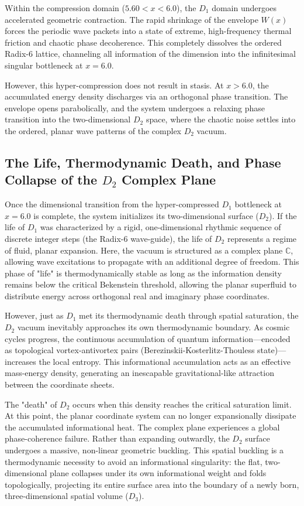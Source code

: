 \documentclass[11pt,a4paper]{article}
\theoremstyle{plain}
\theoremstyle{definition}
\theoremstyle{remark}
\begin{document}
Within the compression domain ($5.60 < x < 6.0$), the $D_1$ domain undergoes accelerated geometric contraction. The rapid shrinkage of the envelope $W(x)$ forces the periodic wave packets into a state of extreme, high-frequency thermal friction and chaotic phase decoherence. This completely dissolves the ordered Radix-6 lattice, channeling all information of the dimension into the infinitesimal singular bottleneck at $x = 6.0$.

However, this hyper-compression does not result in stasis. At $x > 6.0$, the accumulated energy density discharges via an orthogonal phase transition. The envelope opens parabolically, and the system undergoes a relaxing phase transition into the two-dimensional $D_2$ space, where the chaotic noise settles into the ordered, planar wave patterns of the complex $D_2$ vacuum.

\newpage
\subsection{The Life, Thermodynamic Death, and Phase Collapse of the $D_2$ Complex Plane}
Once the dimensional transition from the hyper-compressed $D_1$ bottleneck at $x = 6.0$ is complete, the system initializes its two-dimensional surface ($D_2$). If the life of $D_1$ was characterized by a rigid, one-dimensional rhythmic sequence of discrete integer steps (the Radix-6 wave-guide), the life of $D_2$ represents a regime of fluid, planar expansion. Here, the vacuum is structured as a complex plane $\mathbb{C}$, allowing wave excitations to propagate with an additional degree of freedom. This phase of "life" is thermodynamically stable as long as the information density remains below the critical Bekenstein threshold, allowing the planar superfluid to distribute energy across orthogonal real and imaginary phase coordinates.

However, just as $D_1$ met its thermodynamic death through spatial saturation, the $D_2$ vacuum inevitably approaches its own thermodynamic boundary. As cosmic cycles progress, the continuous accumulation of quantum information—encoded as topological vortex-antivortex pairs (Berezinskii-Kosterlitz-Thouless state)—increases the local entropy. This informational accumulation acts as an effective mass-energy density, generating an inescapable gravitational-like attraction between the coordinate sheets. 

The "death" of $D_2$ occurs when this density reaches the critical saturation limit. At this point, the planar coordinate system can no longer expansionally dissipate the accumulated informational heat. The complex plane experiences a global phase-coherence failure. Rather than expanding outwardly, the $D_2$ surface undergoes a massive, non-linear geometric buckling. This spatial buckling is a thermodynamic necessity to avoid an informational singularity: the flat, two-dimensional plane collapses under its own informational weight and folds topologically, projecting its entire surface area into the boundary of a newly born, three-dimensional spatial volume ($D_3$).
\end{document}

